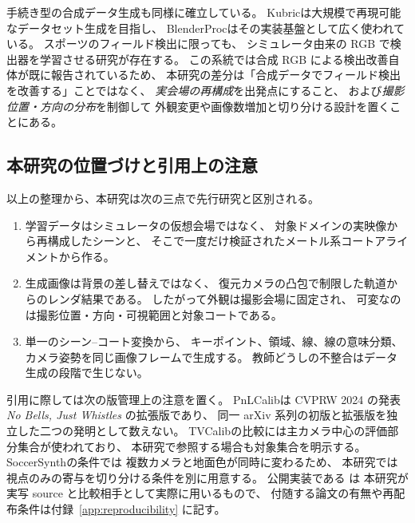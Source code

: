 手続き型の合成データ生成も同様に確立している。
Kubric\cite{greff2022kubric}は大規模で再現可能なデータセット生成を目指し、
BlenderProc\cite{denninger2019blenderproc}はその実装基盤として広く使われている。
スポーツのフィールド検出に限っても、
シミュレータ由来の RGB で検出器を学習させる研究\cite{qin2025soccersynth}が存在する。
この系統では合成 RGB による検出改善自体が既に報告されているため、
本研究の差分は「合成データでフィールド検出を改善する」ことではなく、
\emph{実会場の再構成}を出発点にすること、
および\emph{撮影位置・方向の分布}を制御して
外観変更や画像数増加と切り分ける設計を置くことにある。

\subsection{本研究の位置づけと引用上の注意}

以上の整理から、本研究は次の三点で先行研究と区別される。

\begin{enumerate}[leftmargin=1.6em]
  \item 学習データはシミュレータの仮想会場ではなく、
  対象ドメインの実映像から再構成したシーンと、
  そこで一度だけ検証されたメートル系コートアライメントから作る。
  \item 生成画像は背景の差し替えではなく、
  復元カメラの凸包で制限した軌道からのレンダ結果である。
  したがって外観は撮影会場に固定され、
  可変なのは撮影位置・方向・可視範囲と対象コートである。
  \item 単一のシーン--コート変換から、
  キーポイント、領域、線、線の意味分類、カメラ姿勢を同じ画像フレームで生成する。
  教師どうしの不整合はデータ生成の段階で生じない。
\end{enumerate}

引用に際しては次の版管理上の注意を置く。
PnLCalib\cite{gutierrez2026pnlcalib}は CVPRW 2024 の発表
\emph{No Bells, Just Whistles} の拡張版であり、
同一 arXiv 系列の初版と拡張版を独立した二つの発明として数えない。
TVCalib\cite{theiner2023tvcalib}の比較には主カメラ中心の評価部分集合が使われており、
本研究で参照する場合も対象集合を明示する。
SoccerSynth\cite{qin2025soccersynth}の条件では
複数カメラと地面色が同時に変わるため、
本研究では視点のみの寄与を切り分ける条件を別に用意する。
公開実装である \BaselineName\cite{tcdrepo} は
本研究が実写 source と比較相手として実際に用いるもので、
付随する論文の有無や再配布条件は付録~\ref{app:reproducibility} に記す。
